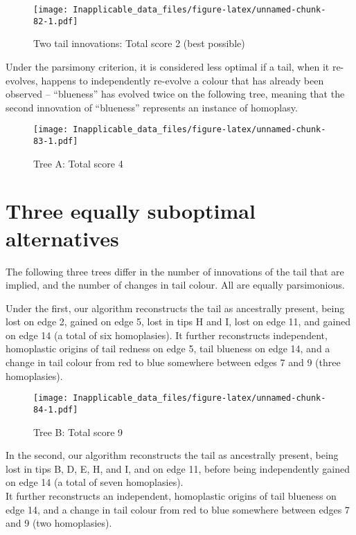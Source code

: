 \documentclass[]{book}
\theoremstyle{definition}
\theoremstyle{definition}
\theoremstyle{definition}
\theoremstyle{remark}
\begin{document}
\begin{figure}
\centering
\texttt{[image: Inapplicable\_data\_files/figure-latex/unnamed-chunk-82-1.pdf]}
\caption{\label{fig:unnamed-chunk-82}Two tail innovations: Total score 2
(best possible)}
\end{figure}

Under the parsimony criterion, it is considered less optimal if a tail,
when it re-evolves, happens to independently re-evolve a colour that has
already been observed -- ``blueness'' has evolved twice on the following
tree, meaning that the second innovation of ``blueness'' represents an
instance of homoplasy.

\begin{figure}
\centering
\texttt{[image: Inapplicable\_data\_files/figure-latex/unnamed-chunk-83-1.pdf]}
\caption{\label{fig:unnamed-chunk-83}Tree A: Total score 4}
\end{figure}

\hypertarget{three-equally-suboptimal-alternatives}{%
\section{Three equally suboptimal
alternatives}\label{three-equally-suboptimal-alternatives}}

The following three trees differ in the number of innovations of the
tail that are implied, and the number of changes in tail colour. All are
equally parsimonious.

Under the first, our algorithm reconstructs the tail as ancestrally
present, being lost on edge 2, gained on edge 5, lost in tips H and I,
lost on edge 11, and gained on edge 14 (a total of six homoplasies). It
further reconstructs independent, homoplastic origins of tail redness on
edge 5, tail blueness on edge 14, and a change in tail colour from red
to blue somewhere between edges 7 and 9 (three homoplasies).

\begin{figure}
\centering
\texttt{[image: Inapplicable\_data\_files/figure-latex/unnamed-chunk-84-1.pdf]}
\caption{\label{fig:unnamed-chunk-84}Tree B: Total score 9}
\end{figure}

In the second, our algorithm reconstructs the tail as ancestrally
present, being lost in tips B, D, E, H, and I, and on edge 11, before
being independently gained on edge 14 (a total of seven homoplasies).\\
It further reconstructs an independent, homoplastic origins of tail
blueness on edge 14, and a change in tail colour from red to blue
somewhere between edges 7 and 9 (two homoplasies).
\end{document}
